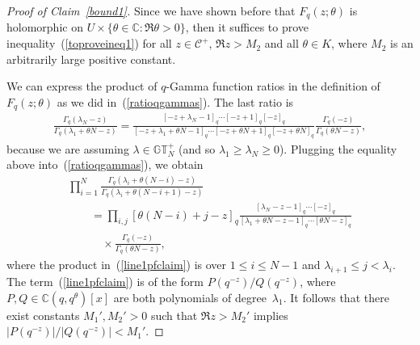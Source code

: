 \documentclass[pdftex]{sigma}
\numberwithin{equation}{section}
\newcommand{\C}{\mathbb{C}}
\newcommand{\CC}{\mathcal{C}}
\newcommand{\GTp}{\mathbb{GT}^+}
\begin{document}
\begin{proof}[Proof of Claim~\ref{bound1}]
Since we have shown before that $F_q(z; \theta)$ is holomorphic on $U\times\{\theta\in\C\colon \Re\theta > 0\}$, then it suf\/f\/ices to prove inequality~(\ref{toproveineq1}) for all $z\in\CC^+$, $\Re z > M_2$ and all $\theta\in K$, where $M_2$ is an arbitrarily large positive constant.

We can express the product of $q$-Gamma function ratios in the def\/inition of $F_q(z; \theta)$ as we did in~(\ref{ratioqgammas}). The last ratio is
\begin{gather*}
\frac{\Gamma_q(\lambda_N - z)}{\Gamma_q(\lambda_1 + \theta N - z)} = \frac{[-z + \lambda_N - 1]_q\cdots [-z+1]_q[-z]_q}{[-z + \lambda_1 + \theta N - 1]_q\cdots [-z + \theta N + 1]_q[-z + \theta N]_q}\frac{\Gamma_q(-z)}{\Gamma_q(\theta N - z)},
\end{gather*}
because we are assuming $\lambda\in\GTp_N$ (and so $\lambda_1 \geq \lambda_N \geq 0$). Plugging the equality above into~(\ref{ratioqgammas}), we obtain
\begin{gather}
\prod_{i=1}^N{\frac{\Gamma_q(\lambda_i + \theta(N - i) - z)}{\Gamma_q(\lambda_i + \theta(N - i + 1) - z) }} \nonumber\\
\qquad{} = \prod_{i, j}{ [\theta (N - i) + j - z]_q }\frac{[\lambda_N - z - 1]_q\cdots [-z]_q}{[\lambda_1 + \theta N - z - 1]_q\cdots [\theta N - z]_q}\label{line1pfclaim}\\
\qquad\quad{} \times\frac{\Gamma_q(-z)}{\Gamma_q(\theta N - z)},\label{line2pfclaim}
\end{gather}
where the product in~(\ref{line1pfclaim}) is over $1 \leq i \leq N-1$ and $\lambda_{i+1} \leq j < \lambda_i$.
The term~(\ref{line1pfclaim}) is of the form $P(q^{-z})/Q(q^{-z})$, where $P, Q\in\C(q, q^{\theta})[x]$ are both polynomials of degree~$\lambda_1$. It follows that there exist constants $M_1', M_2' > 0$ such that $\Re z > M_2'$ implies $|P(q^{-z})|/|Q(q^{-z})| < M_1'$.


\end{proof}
\end{document}
